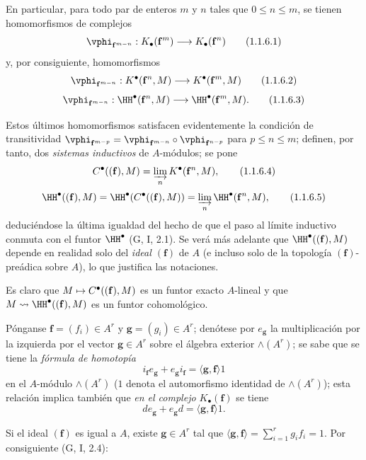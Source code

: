 \documentclass[oneside]{amsart}
\makeatletter
\renewcommand{\leq}{\leqslant}
\newcommand{\ega@arrow}[2]{\mathchoice{#1}{#2}{#2}{#2}}
\let\ega@shortmapsto\mapsto
\renewcommand{\to}{\ega@arrow{\longrightarrow}{\rightarrow}}
\renewcommand{\mapsto}{\ega@arrow{\longmapsto}{\ega@shortmapsto}}
\newcommand{\oldpage}[2][]{{\marginnote{\normalfont\textbf{#1}~|~#2}}\ignorespaces}
\let\EGAOriginalLabel\label
\renewcommand{\label}[1]{\phantomsection\EGAOriginalLabel{#1}}
\makeatother
\begin{document}
\begin{env}[1.1.6]
\label{III.1.1.6}
En particular, para todo par de enteros $m$ y $n$ tales que $0\leq n\leq m$, se tienen homomorfismos de complejos
\[
  \vphi_{\mathbf{f}^{m-n}}:K_\bullet(\mathbf{f}^m)\to K_\bullet(\mathbf{f}^n)
  \tag{1.1.6.1}
\]
y, por consiguiente, homomorfismos
\[
  \vphi_{\mathbf{f}^{m-n}}:K^\bullet(\mathbf{f}^n,M)\to K^\bullet(\mathbf{f}^m,M)
  \tag{1.1.6.2}
\]
\[
  \vphi_{\mathbf{f}^{m-n}}:\HH^\bullet(\mathbf{f}^n,M)\to\HH^\bullet(\mathbf{f}^m,M).
  \tag{1.1.6.3}
\]

\oldpage[III]{85}
Estos últimos homomorfismos satisfacen evidentemente la condición de transitividad $\vphi_{\mathbf{f}^{m-p}}=\vphi_{\mathbf{f}^{m-n}}\circ\vphi_{\mathbf{f}^{n-p}}$ para $p\leq n\leq m$; definen, por tanto, dos \emph{sistemas inductivos} de $A$-módulos; se pone
\[
  C^\bullet((\mathbf{f}),M)=\varinjlim_n K^\bullet(\mathbf{f}^n,M),
  \tag{1.1.6.4}
\]
\[
  \HH^\bullet((\mathbf{f}),M)=\HH^\bullet(C^\bullet((\mathbf{f}),M))=\varinjlim_n\HH^\bullet(\mathbf{f}^n,M),
  \tag{1.1.6.5}
\]
deduciéndose la última igualdad del hecho de que el paso al límite inductivo conmuta con el funtor $\HH^\bullet$ (G, I, 2.1).
Se verá más adelante  que $\HH^\bullet((\mathbf{f}),M)$ depende en realidad solo del \emph{ideal $(\mathbf{f})$} de $A$ (e incluso solo de la topología $(\mathbf{f})$-preádica sobre $A$), lo que justifica las notaciones.

Es claro que $M\mapsto C^\bullet((\mathbf{f}),M)$ es un funtor exacto $A$-lineal y que $M\leadsto\HH^\bullet((\mathbf{f}),M)$ es un funtor cohomológico.
\end{env}

\begin{env}[1.1.7]
\label{III.1.1.7}
Pónganse $\mathbf{f}=(f_i)\in A^r$ y $\mathbf{g}=(g_i)\in A^r$; denótese por $e_\mathbf{g}$ la multiplicación por la izquierda por el vector $\mathbf{g}\in A^r$ sobre el álgebra exterior $\wedge(A^r)$; se sabe que se tiene la \emph{fórmula de homotopía}
\[
  i_\mathbf{f}e_\mathbf{g}+e_\mathbf{g}i_\mathbf{f}=\langle\mathbf{g},\mathbf{f}\rangle 1
  \tag{1.1.7.1}
\]
en el $A$-módulo $\wedge(A^r)$ ($1$ denota el automorfismo identidad de $\wedge(A^r)$); esta relación implica también que \emph{en el complejo $K_\bullet(\mathbf{f})$} se tiene
\[
  de_\mathbf{g}+e_\mathbf{g}d=\langle\mathbf{g},\mathbf{f}\rangle 1.
  \tag{1.1.7.2}
\]

Si el ideal $(\mathbf{f})$ es igual a $A$, existe $\mathbf{g}\in A^r$ tal que $\langle\mathbf{g},\mathbf{f}\rangle=\sum_{i=1}^r g_i f_i=1$.
Por consiguiente (G, I, 2.4):
\end{env}
\end{document}
